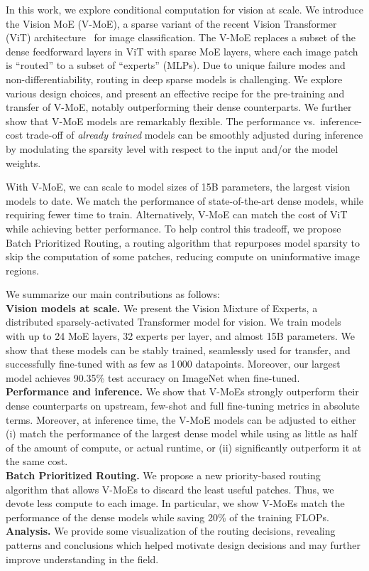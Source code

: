 \documentclass{article}
\newcommand{\name}{Vision MoE}
\newcommand{\abbv}{{V-MoE}}
\newcommand{\maxrouting}{Batch Prioritized Routing}
\begin{document}
In this work, we explore conditional computation for vision at scale.
We introduce the \name{} (\abbv{}), a sparse variant of the recent Vision Transformer (ViT) architecture~\cite{dosovitskiy2020image} for image classification.
The \abbv{} replaces a subset of the dense feedforward layers in ViT with sparse MoE layers, where each image patch is ``routed'' to a subset of ``experts'' (MLPs).
Due to unique failure modes and non-differentiability, routing in deep sparse models is challenging.
We explore various design choices, and present an effective recipe for the pre-training and transfer of \abbv{}, notably outperforming their dense counterparts.
We further show that \abbv{} models are remarkably flexible. The performance vs.~inference-cost trade-off of \textit{already trained} models can be smoothly adjusted during inference by modulating the sparsity level with respect to the input and/or the model weights.

With \abbv{}, we can scale to model sizes of 15B parameters, the largest vision models to date.
We match the performance of state-of-the-art dense models, while requiring fewer time to train. 
Alternatively, \abbv{} can match the cost of ViT while achieving better performance.
To help control this tradeoff, we propose \maxrouting{}, a routing algorithm that repurposes model sparsity to skip the computation of some patches, reducing compute on uninformative image regions. 

We summarize our main contributions as follows:\\
\textbf{Vision models at scale.}
We present the Vision Mixture of Experts, a distributed sparsely-activated Transformer model for vision. We train models with up to 24 MoE layers, 32 experts per layer, and almost 15B parameters.
We show that these models can be stably trained, seamlessly used for transfer, and successfully fine-tuned with as few as 1\,000 datapoints. Moreover, our largest model achieves 90.35\% test accuracy on ImageNet when fine-tuned. \\
\textbf{Performance and inference.}
We show that \abbv{}s strongly outperform their dense counterparts on upstream, few-shot and full fine-tuning metrics in absolute terms.
Moreover, at inference time, the V-MoE models can be adjusted to either (i) match the performance of the largest dense model while using as little as half of the amount of compute, or actual runtime, or (ii) significantly outperform it at the same cost. \\
\textbf{\maxrouting{}.}
We propose a new priority-based routing algorithm that allows V-MoEs to discard the least useful patches.
Thus, we devote less compute to each image.
In particular, we show V-MoEs match the performance of the dense models while saving 20\% of the training FLOPs. \\
\textbf{Analysis.}
We provide some visualization of the routing decisions, revealing patterns and conclusions which helped motivate design decisions and may further improve understanding in the field.
\end{document}
